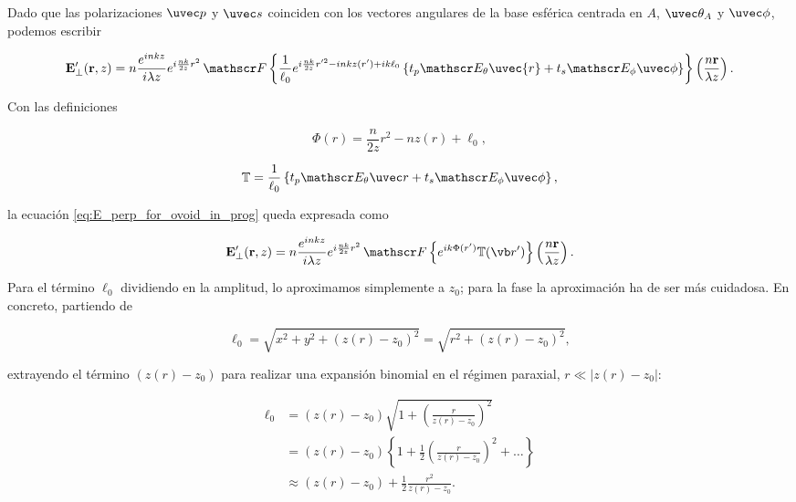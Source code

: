 Dado que las polarizaciones $\uvec p$ y $\uvec s$ coinciden con los vectores angulares de la base esférica centrada en $A$, $\uvec \theta_A$ y $\uvec \phi$, podemos escribir

\begin{equation}
\mathbf{E}'_\perp(\mathbf r,z)
=
n\frac{e^{inkz}}{i\lambda z}e^{i\frac{nk}{2z}r^2}
\,
\mathscr F
\left\{
\frac{1}{\ell_0}
e^{i\frac{nk}{2 z}r'^2 - inkz(r') + ik\ell_0}
\left\{
t_p \mathscr E_{\theta} \uvec{r}
+
t_s \mathscr E_{\phi} \uvec \phi
\right\}
\right\}
\left(
\frac{n\mathbf r}{\lambda z}
\right).
\label{eq:E_perp_for_ovoid_in_prog}
\end{equation}

Con las definiciones

\begin{equation}
  \Phi(r)
  =
  \frac{n}{2z}r^2
  -
  nz(r)
  +
  \ell_0,
\end{equation}

\begin{equation}
  \mathbb T
  =
  \frac{1}{\ell_0}
  \left\{
  t_p \mathscr E_\theta \uvec r
  +
  t_s \mathscr E_\phi \uvec \phi
  \right\},
\end{equation}

la ecuación \eqref{eq:E_perp_for_ovoid_in_prog} queda expresada como

\begin{equation}
\mathbf{E}'_\perp(\mathbf r,z)
=
n\frac{e^{inkz}}{i\lambda z}e^{i\frac{nk}{2z}r^2}
\,
\mathscr F
\left\{
e^{ik\Phi(r')} \mathbb T(\vb r')
\right\}
\left(
\frac{n\mathbf r}{\lambda z}
\right).
\label{eq:E_field_perp_no_phase_replacement}
\end{equation}

Para el término $\ell_0$ dividiendo en la amplitud, lo aproximamos simplemente a $z_0$; para la fase la aproximación ha de ser más cuidadosa. En concreto, partiendo de

\begin{equation}
    \ell_0
    =
    \sqrt{x^2 + y^2 + (z(r) - z_0)^2}
    =
    \sqrt{r^2 + (z(r) - z_0)^2},
\end{equation}

extrayendo el término $(z(r) - z_0)$ para realizar una expansión binomial en el régimen paraxial, $r \ll |z(r)-z_0|$:

\begin{align}
    \ell_0
    &=
    (z(r) - z_0)
    \sqrt{
    1
    +
    \left(
    \frac{r}{z(r) - z_0}
    \right)^2
    }
    \nonumber
    \\
    &=
    (z(r) - z_0)
    \left\{
    1
    +
    \frac{1}{2}
    \left(
    \frac{r}{z(r) - z_0}
    \right)^2
    +
    \dots
    \right\}
    \nonumber
    \\
    &\approx
    (z(r) - z_0)
    +
    \frac{1}{2}
    \frac{r^2}{z(r) - z_0}.
\end{align}

